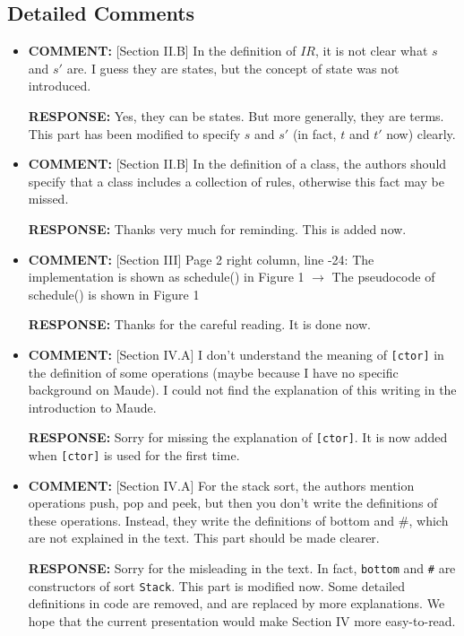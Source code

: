 \documentclass[10pt,journal]{IEEEtran}
\newcommand{\ANSWER}{{\bf RESPONSE: }}
\newcommand{\COMMENT}{{\bf COMMENT: }}
\begin{document}
\subsection{Detailed Comments}
\begin{itemize}
\item
\COMMENT [Section II.B] In the definition of $IR$, it is not clear
what $s$ and $s'$ are. I guess they are states, but the concept of
state was not introduced.

\ANSWER Yes, they can be states. But more generally, they are
terms. This part has been modified to specify $s$ and $s'$ (in fact,
$t$ and $t'$ now) clearly.

\item 
\COMMENT [Section II.B] In the definition of a class, the authors
should specify that a class includes a collection of rules, otherwise
this fact may be missed.

\ANSWER Thanks very much for reminding. This is added now.

\item
\COMMENT [Section III] Page 2 right column, line -24: The
implementation is shown as schedule() in Figure 1 $\rightarrow$ The
pseudocode of schedule() is shown in Figure 1

\ANSWER Thanks for the careful reading. It is done now.

\item 
\COMMENT [Section IV.A] I don't understand the meaning of
\verb|[ctor]| in the definition of some operations (maybe because I
have no specific background on Maude). I could not find the
explanation of this writing in the introduction to Maude.

\ANSWER Sorry for missing the explanation of \verb|[ctor]|. It is now
added when \verb|[ctor]| is used for the first time.

\item
\COMMENT [Section IV.A] For the stack sort, the authors mention
operations push, pop and peek, but then you don't write the
definitions of these operations. Instead, they write the definitions
of bottom and \#, which are not explained in the text. This part
should be made clearer.

\ANSWER Sorry for the misleading in the text. In fact, \verb|bottom|
and \verb|#| are constructors of sort \verb|Stack|. This part is
modified now. Some detailed definitions in code are removed, and are
replaced by more explanations. We hope that the current presentation
would make Section IV more easy-to-read.


\end{itemize}
\end{document}
